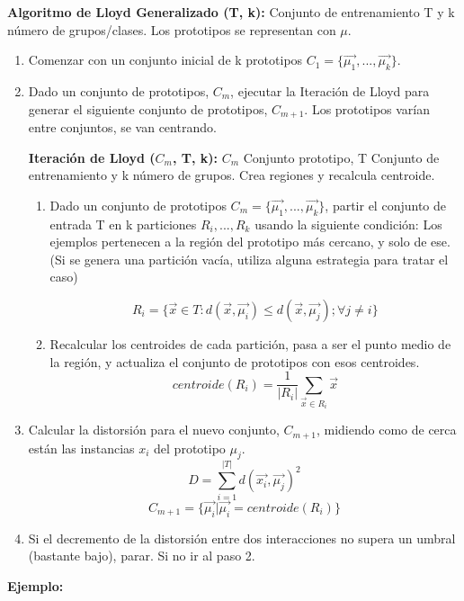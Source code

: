\documentclass[12pt, twoside, openright]{report} %
\begin{document}
\textbf{Algoritmo de Lloyd Generalizado (T, k):} Conjunto de entrenamiento T y k número de grupos/clases. Los prototipos se representan con $\mu$.

\begin{enumerate}
  \item Comenzar con un conjunto inicial de k prototipos $C_1 = \{\vec{\mu_1}, ..., \vec{\mu_k} \}$.
  \item Dado un conjunto de prototipos, $C_m$, ejecutar la Iteración de Lloyd para generar el siguiente conjunto de prototipos, $C_{m+1}$. Los prototipos varían entre conjuntos, se van centrando.
  
  \textbf{Iteración de Lloyd ($C_m$, T, k):} $C_m$ Conjunto prototipo, T Conjunto de entrenamiento y k número de grupos. Crea regiones y recalcula centroide.
  \begin{enumerate}
    \item Dado un conjunto de prototipos $C_m = \{\vec{\mu_1}, ..., \vec{\mu_k} \}$, partir el conjunto de entrada T en k particiones $R_i, ..., R_k$ usando la siguiente condición: Los ejemplos pertenecen a la región del prototipo más cercano, y solo de ese. (Si se genera una partición vacía, utiliza alguna estrategia para tratar el caso)
    
    $$R_i = \{ \vec{x} \in T: d(\vec{x}, \vec{\mu_i}) \leq d(\vec{x}, \vec{\mu_j}); \forall j \neq i \}$$
    
    \item Recalcular los centroides de cada partición, pasa a ser el punto medio de la región, y actualiza el conjunto de prototipos con esos centroides.
    $$centroide(R_i) = \frac{1}{|R_i|} \sum_{\vec{x} \in R_i} \vec{x}$$
  \end{enumerate}
  \item Calcular la distorsión para el nuevo conjunto, $C_{m+1}$, midiendo como de cerca están las instancias $x_i$ del prototipo $\mu_j$.
  $$D = \sum^{|T|}_{i=1} d( \vec{x_i}, \vec{\mu_j})^2$$
  $$C_{m+1} = \{\vec{\mu_i}|\vec{\mu_i} = centroide(R_i) \}$$
  \item Si el decremento de la distorsión entre dos interacciones no supera un umbral (bastante bajo), parar. Si no ir al paso 2. 
\end{enumerate}

\textbf{Ejemplo:}
\end{document}
